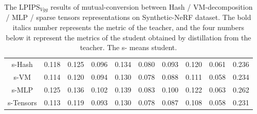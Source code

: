 \documentclass[letterpaper]{article} \usepackage{aaai23}  \usepackage{times}  \usepackage{helvet}  \usepackage{courier}  \usepackage[hyphens]{url}  \usepackage{graphicx} \urlstyle{rm} \def\UrlFont{\rm}  \usepackage{natbib}  \usepackage{caption} \frenchspacing  \setlength{\pdfpagewidth}{8.5in}  \setlength{\pdfpageheight}{11in}  \usepackage{multirow}
\begin{document}
\begin{table*}[t]
{\begin{tabular}{c|ccccccccc}
s-Hash                      & 0.118                   & 0.125                   & 0.096                   & 0.134                   & 0.080                   & 0.093                   & 0.120                   & 0.061                   & 0.236                   \\
s-VM                        & 0.114                   & 0.120                   & 0.094                   & 0.130                   & 0.078                   & 0.088                   & 0.111                   & 0.058                   & 0.234                   \\
s-MLP                       & 0.125                   & 0.136                   & 0.102                   & 0.139                   & 0.083                   & 0.100                   & 0.122                   & 0.063                   & 0.262                   \\
s-Tensors                   & 0.113                   & 0.119                   & 0.093                   & 0.130                   & 0.078                   & 0.087                   & 0.108                   & 0.058                   & 0.231                   \\ \hline
\end{tabular}
}
\caption{ The $\text{LPIPS}_{Vgg}$ results of mutual-conversion between Hash / VM-decomposition / MLP / sparse tensors representations on  Synthetic-NeRF dataset. The bold italics number represents the metric of the teacher, and the four numbers below it represent the metrics of the student obtained by distillation from the teacher. The s- means
student.}
\label{tab-vgg-mutual-syn}
\end{table*}
\end{document}
